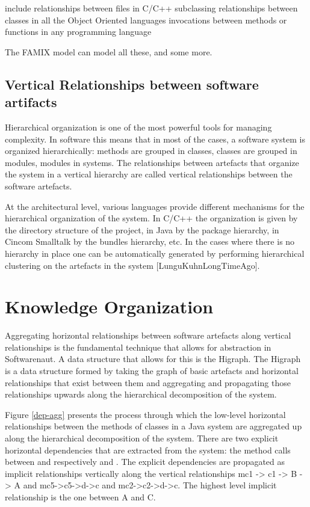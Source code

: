\documentclass[preprint,12pt]{elsarticle}
\begin{document}
include relationships between files in C/C++
subclassing relationships between classes in all the Object Oriented languages
invocations between methods or functions in any programming language

The FAMIX model can model all these, and some more.


\subsection {Vertical Relationships between software artifacts}

Hierarchical organization is one of the most powerful tools for managing complexity. In software this means that in most of the cases, a software system is organized hierarchically: methods are grouped in classes, classes are grouped in modules, modules in systems. The relationships between artefacts that organize the system in a vertical hierarchy are called vertical relationships between the software artefacts. 

At the architectural level, various languages provide different mechanisms for the hierarchical organization of the system. In C/C++ the organization is given by the directory structure of the project, in Java by the package hierarchy, in Cincom Smalltalk by the bundles hierarchy, etc. In the cases where there is no hierarchy in place one can be automatically generated by performing hierarchical clustering on the artefacts in the system [LunguKuhnLongTimeAgo]. 



\section {Knowledge Organization}
\label{sec:org}

Aggregating horizontal relationships between software artefacts along vertical relationships is the fundamental technique that allows for abstraction in Softwarenaut. A data structure that allows for this is the Higraph\cite{harel-visform}. The Higraph is a data structure formed by taking the graph of basic artefacts and horizontal relationships that exist between them and aggregating and propagating those relationships upwards along the hierarchical decomposition of the system. 

Figure \ref{dep-agg} presents the process through which the low-level horizontal relationships between the methods of classes in a Java system are aggregated up along the hierarchical decomposition of the system. There are two explicit horizontal dependencies that are extracted from the system: the method calls between  and respectively  and . 
The explicit dependencies are propagated as implicit relationships vertically along the vertical relationships mc1 -> c1 -> B -> A and mc5->c5->d->c and mc2->c2->d->c. The highest level implicit relationship is the one between A and C. 
\end{document}
